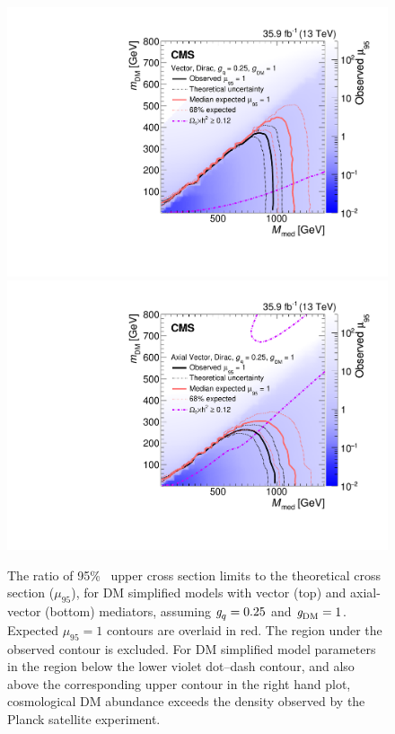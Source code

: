 \begin{figure}[htbp]
  \centering
    \includegraphics[width=0.45\textheight]{Analysis/Figures/limits_vector.pdf}
    \includegraphics[width=0.45\textheight]{Analysis/Figures/limits_axial.pdf}
    \caption{
      The ratio of 95\% \CL\ upper cross section limits to the theoretical cross section ($\mu_{95}$), for DM simplified models with vector (top) and axial-vector (bottom) mediators, assuming $\gq=0.25$ and $\gDM=1$.
      Expected $\mu_{95} = 1$ contours are overlaid in red. 
      The region under the observed contour is excluded. For DM simplified model parameters in the region below the lower violet dot--dash contour, and also above the corresponding upper contour in the right hand plot, cosmological DM abundance exceeds the density observed by the Planck satellite experiment.
    }
    \label{fig:limits}
\end{figure}

